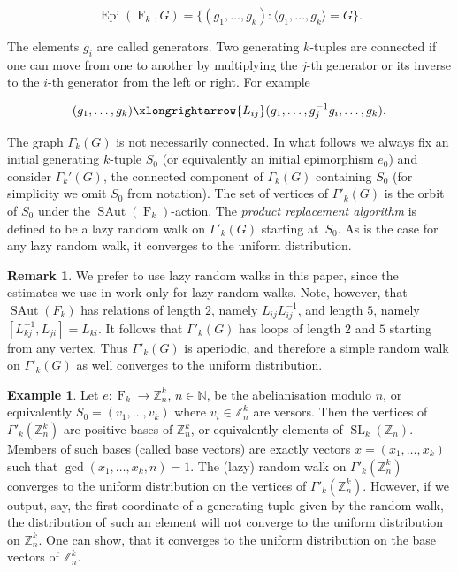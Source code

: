 \documentclass[12pt]{amsart}
\theoremstyle{definition}
\newtheorem{example}[theorem]{Example}
\newtheorem{remark}[theorem]{Remark}
\numberwithin{figure}{section}
\numberwithin{table}{section}
\numberwithin{equation}{section}
\newcommand{\OP}[1]{\operatorname{#1}}
\newcommand{\SAut}{\operatorname{SAut}}
\newcommand{\Epi}{\operatorname{Epi}}
\newcommand{\F}{\operatorname{F}}
\newcommand{\SL}{\operatorname{SL}}
\newcommand{\BB}[1]{{\mathbb #1}}
\begin{document}
$$
\Epi(\F_k,G) = \{ (g_1,\ldots,g_k) \colon \langle g_1,\ldots,g_k \rangle = G \}.
$$

The elements $g_i$ are called generators. Two generating $k$-tuples are connected if one can move from one to another by multiplying the $j$-th generator or its inverse to the $i$-th generator from the left or right. For example

$$
(g_1,\ldots,g_k) \xlongrightarrow{L_{ij}} (g_1,\ldots,g_j^{-1}g_i,\ldots,g_k).
$$

The graph $\Gamma_k(G)$ is not necessarily connected.
In what follows we always fix an initial generating $k$-tuple $S_0$ (or equivalently an initial epimorphism $e_0$) and consider  $\Gamma_k'(G)$, the connected component of $\Gamma_k(G)$ containing $S_0$ (for simplicity we omit $S_0$ from notation). The set of vertices of $\Gamma'_k(G)$ is the orbit of $S_0$ under the $\SAut(\F_k)$-action. The \textit{product replacement algorithm} is defined to be a lazy random walk on $\Gamma'_k(G)$ starting at~$S_0$. As is the case for any lazy random walk, it converges to the uniform distribution. 

\begin{remark} We prefer to use lazy random walks in this paper, since the estimates we use in  work only for lazy random walks. Note, however, that $\SAut(F_k)$ has relations of length $2$, namely $L_{ij}L^{-1}_{ij}$, and length $5$, namely $[L^{-1}_{kj},L_{ji}] = L_{ki}$. It follows that $\Gamma'_k(G)$ has loops of length $2$ and $5$ starting from any vertex. Thus $\Gamma'_k(G)$ is aperiodic, and therefore a simple random walk on $\Gamma'_k(G)$ as well converges to the uniform distribution. 
\end{remark}

\begin{example}\label{e:Z^k}
Let $e \colon \F_k \to \BB Z_n^k$, $n \in \BB N$, be the abelianisation modulo $n$, or equivalently $S_0 =(v_1,\ldots,v_k)$ where $v_i \in \BB Z_n^k$ are versors. Then the vertices of $\Gamma'_k(\BB Z_n^k)$ are positive bases of $\BB Z_n^k$, or equivalently elements of $\SL_k(\BB Z_n)$. Members of such bases (called base vectors) are exactly vectors $x = (x_1,\ldots,x_k)$ such that $\OP{gcd}(x_1,\ldots,x_k,n)=1$. The (lazy) random walk on $\Gamma'_k(\BB Z_n^k)$ converges to the uniform distribution on the vertices of $\Gamma'_k(\BB Z_n^k)$. However, if we output, say, the first coordinate of a generating tuple given by the random walk, the distribution of such an element will not converge to the uniform distribution on $\BB Z_n^k$. One can show, that it converges to the uniform distribution on the base vectors of $\BB Z_n^k$.
\end{example}
\end{document}

